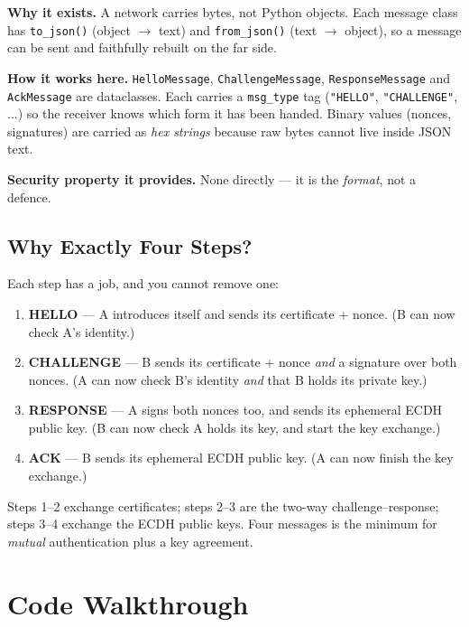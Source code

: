 \documentclass[11pt,a4paper]{article}
\begin{document}
\textbf{Why it exists.} A network carries bytes, not Python objects. Each message
class has \texttt{to\_json()} (object $\to$ text) and \texttt{from\_json()} (text
$\to$ object), so a message can be sent and faithfully rebuilt on the far side.

\textbf{How it works here.} \texttt{HelloMessage}, \texttt{ChallengeMessage},
\texttt{ResponseMessage} and \texttt{AckMessage} are dataclasses. Each carries a
\texttt{msg\_type} tag (\texttt{"HELLO"}, \texttt{"CHALLENGE"}, ...) so the
receiver knows which form it has been handed. Binary values (nonces, signatures)
are carried as \emph{hex strings} because raw bytes cannot live inside JSON text.

\textbf{Security property it provides.} None directly --- it is the
\emph{format}, not a defence.

\subsection{Why Exactly Four Steps?}
Each step has a job, and you cannot remove one:
\begin{enumerate}
  \item \textbf{HELLO} --- A introduces itself and sends its certificate + nonce.
        (B can now check A's identity.)
  \item \textbf{CHALLENGE} --- B sends its certificate + nonce \emph{and} a
        signature over both nonces. (A can now check B's identity \emph{and}
        that B holds its private key.)
  \item \textbf{RESPONSE} --- A signs both nonces too, and sends its ephemeral
        ECDH public key. (B can now check A holds its key, and start the key
        exchange.)
  \item \textbf{ACK} --- B sends its ephemeral ECDH public key. (A can now finish
        the key exchange.)
\end{enumerate}
Steps 1--2 exchange certificates; steps 2--3 are the two-way challenge--response;
steps 3--4 exchange the ECDH public keys. Four messages is the minimum for
\emph{mutual} authentication plus a key agreement.

\section{Code Walkthrough}
\end{document}
